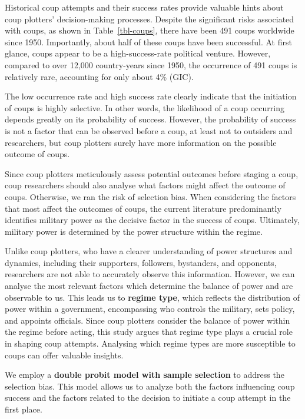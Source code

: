 \documentclass[
  12pt,
]{report}
\begin{document}
Historical coup attempts and their success rates provide valuable hints
about coup plotters' decision-making processes. Despite the significant
risks associated with coups, as shown in Table~\ref{tbl-coups}, there
have been 491 coups worldwide since 1950. Importantly, about half of
these coups have been successful. At first glance, coups appear to be a
high-success-rate political venture. However, compared to over 12,000
country-years since 1950, the occurrence of 491 coups is relatively
rare, accounting for only about 4\% (GIC).

The low occurrence rate and high success rate clearly indicate that the
initiation of coups is highly selective. In other words, the likelihood
of a coup occurring depends greatly on its probability of success.
However, the probability of success is not a factor that can be observed
before a coup, at least not to outsiders and researchers, but coup
plotters surely have more information on the possible outcome of coups.

Since coup plotters meticulously assess potential outcomes before
staging a coup, coup researchers should also analyse what factors might
affect the outcome of coups. Otherwise, we ran the risk of selection
bias. When considering the factors that most affect the outcomes of
coups, the current literature predominantly identifies military power as
the decisive factor in the success of coups. Ultimately, military power
is determined by the power structure within the regime.

Unlike coup plotters, who have a clearer understanding of power
structures and dynamics, including their supporters, followers,
bystanders, and opponents, researchers are not able to accurately
observe this information. However, we can analyse the most relevant
factors which determine the balance of power and are observable to us.
This leads us to \textbf{regime type}, which reflects the distribution
of power within a government, encompassing who controls the military,
sets policy, and appoints officials. Since coup plotters consider the
balance of power within the regime before acting, this study argues that
regime type plays a crucial role in shaping coup attempts. Analysing
which regime types are more susceptible to coups can offer valuable
insights.

We employ a \textbf{double probit model with sample selection} to
address the selection bias. This model allows us to analyze both the
factors influencing coup success and the factors related to the decision
to initiate a coup attempt in the first place.
\end{document}
